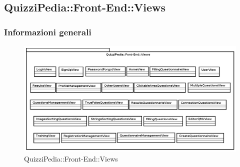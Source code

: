 \newpage
\subsection{QuizziPedia::Front-End::Views}
\subsubsection{Informazioni generali}
\label{QuizziPedia::Front-End::Views}
\begin{figure}[ht]
	\centering
	\includegraphics[scale=0.45]{UML/Package/QuizziPedia_Front-End_Views.png}
	\caption{QuizziPedia::Front-End::Views}
\end{figure}\FloatBarrier
